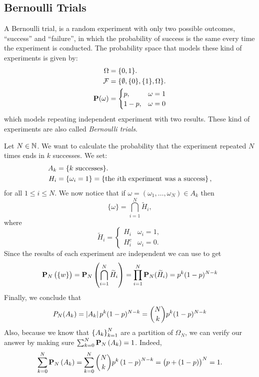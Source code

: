 \documentclass[11pt,a4paper]{article}
\begin{document}
\subsection{Bernoulli Trials}
\begin{example}
  \label{exmp:bernoulli-trial}
  A Bernoulli trial, is a random experiment with only two possible outcomes,
  ``success'' and ``failure'', in which the probability of success is the 
  same every time the experiment is conducted. The probability space that
  models these kind of experiments is given by:
  \begin{align*}
    \Omega &= \{0, 1\}. \\
    \mathcal F &= \{\emptyset, \{0\}, \{1\}, \Omega\}. \\
    \mathbf{P}(\omega) &=
    \begin{cases}
      p, &\omega = 1 \\
      1-p, &\omega= 0
    \end{cases}
  \end{align*}
  which models repeating independent experiment with two results.
  These kind of experiments are also called \textit{Bernoulli trials}.

  Let $N \in \mathbb{N}$.
  We want to calculate the probability that the
  experiment repeated $N$ times ends in $k$ successes.
  We set:
  \begin{align*}
    A_k &= \{\text{$k$ successes}\}. \\
    H_i &= \{\omega_i = 1\} = \left\{\text{the $i$th experiment was a success}\right\},
  \end{align*}
  for all $1 \le i \le N$.
  We now notice that if $\omega = (\omega_1,\dots,\omega_N) \in A_k$ then
  \[
    \{\omega\} = \bigcap_{i=1}^{N} \widetilde H_i,
  \]
  where
  \[
    \widetilde{H}_{i} = 
    \begin{cases}
      H_{i} &\omega_{i} = 1, \\ 
      H_{i}^{c} &\omega_{i} = 0.
    \end{cases}
  \]
  Since the results of each experiment are independent we
  can use  to get
  \[
    \mathbf{P}_N\left(\{w\}\right) =
    \mathbf{P}_N\left(\bigcap_{i=1}^{N} \widetilde{H}_i \right) = 
    \prod_{i=1}^{N} \mathbf{P}_N(\widetilde{H}_i) =
    p^k (1-p)^{N-k}
  \]
  Finally, we conclude that
  \[
    P_N(A_k) = 
    \left\lvert A_k\right\rvert p^k (1-p)^{N-k} = 
    \binom{N}{k} p^k (1-p)^{N-k}
  \]
  Also, because we know that $\left\{A_k\right\}_{k=1}^{N}$
  are a partition of $\Omega_N$,
  we can verify our answer by
  making sure $\sum_{k=0}^{N}\mathbf{P}_{N}\left(A_{k}\right) = 1$.
  Indeed,
  \[
    \sum_{k=0}^{N}\mathbf{P}_{N}\left(A_{k}\right) = 
    \sum_{k=0}^{N}{\binom{N}{k}}p^{k}\left(1-p\right)^{N-k} = 
    \left(p+\left(1-p\right)\right)^{N} = 1.
  \]
\end{example}
\end{document}
